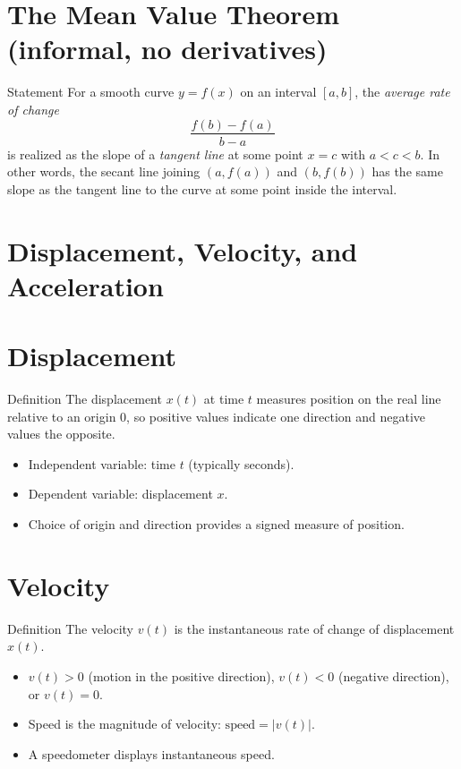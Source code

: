 \section{The Mean Value Theorem (informal, no derivatives)}
  \begin{block}{Statement}
  For a smooth curve $y=f(x)$ on an interval $[a,b]$, the \emph{average rate of change}
  \[ \dfrac{f(b)-f(a)}{b-a} \]
  is realized as the slope of a \emph{tangent line} at some point $x=c$ with $a<c<b$.
  In other words, the secant line joining $(a,f(a))$ and $(b,f(b))$ has the same slope as
  the tangent line to the curve at some point inside the interval.
  \end{block}
  \vspace{0.5em}
\section{Displacement, Velocity, and Acceleration}
\section{Displacement}
  \begin{block}{Definition}
    The displacement $x(t)$ at time $t$ measures position on the real line relative to an origin $0$, so positive values indicate one direction and negative values the opposite.
  \end{block}
  \begin{itemize}
    \item Independent variable: time $t$ (typically seconds).
    \item Dependent variable: displacement $x$.
    \item Choice of origin and direction provides a signed measure of position.
  \end{itemize}

\section{Velocity}
  \begin{block}{Definition}
    The velocity $v(t)$ is the instantaneous rate of change of displacement $x(t)$.
  \end{block}
  \begin{itemize}
    \item $v(t)>0$ (motion in the positive direction), $v(t)<0$ (negative direction), or $v(t)=0$.
    \item Speed is the magnitude of velocity: $\text{speed}=\lvert v(t)\rvert$.
    \item A speedometer displays instantaneous speed.
  \end{itemize}

